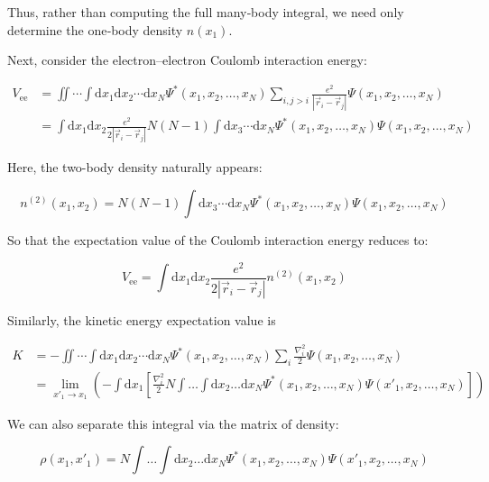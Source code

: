 Thus, rather than computing the full many‐body integral, we need only determine the one‐body density $n(x_1)$.

Next, consider the electron–electron Coulomb interaction energy:

\begin{equation}
\begin{aligned}
    V_\mathrm{ee}
    &= \iint\cdots\int \mathrm{d}x_1\mathrm{d}x_2\cdots\mathrm{d}x_N\Psi^*(x_1,x_2,\dots,x_N)\sum_{i,j>i}\frac{e^2}{|\vec{r}_i-\vec{r}_j|}\Psi(x_1,x_2,\dots,x_N) \\
    &= \int\mathrm{d}x_1\mathrm{d}x_2\frac{e^2}{2|\vec{r}_i-\vec{r}_j|}N(N-1)\int\mathrm{d}x_3\cdots\mathrm{d}x_N\Psi^*(x_1,x_2,\dots,x_N)\Psi(x_1,x_2,\dots,x_N)
\end{aligned}
\label{coulomb_interaction_energy}
\end{equation}

Here, the two-body density naturally appears:

\begin{equation}
n^{(2)}(x_1,x_2)=N(N-1)\int\mathrm{d}x_3\cdots\mathrm{d}x_N\Psi^*(x_1,x_2,\dots,x_N)\Psi(x_1,x_2,\dots,x_N)
\label{two-body_density}
\end{equation}

So that the expectation value of the Coulomb interaction energy reduces to:

\begin{equation}
V_\mathrm{ee}=\int\mathrm{d}x_1\mathrm{d}x_2\frac{e^2}{2|\vec{r}_i-\vec{r}_j|}n^{(2)}(x_1,x_2)
\label{observables_two-body_density}
\end{equation}

Similarly, the kinetic energy expectation value is

\begin{equation}
\begin{aligned}
    K&= -\iint\cdots\int \mathrm{d}x_1\mathrm{d}x_2\cdots\mathrm{d}x_N\Psi^*(x_1,x_2,\dots,x_N)\sum_{i}\frac{\nabla_i^2}{2}\Psi(x_1,x_2,\dots,x_N) \\
    &= \lim_{x'_1\to x_1}\left( -\int\mathrm{d}x_1\left[\frac{\nabla_i^2}{2}N\int\dots\int\mathrm{d}x_2\dots\mathrm{d}x_N\Psi^*(x_1,x_2,\dots,x_N)\Psi(x'_1,x_2,\dots,x_N) \right]\right)
\end{aligned}
\label{kinetic_energy}
\end{equation}

We can also separate this integral via the matrix of density:

\begin{equation}
\rho(x_1,x'_1)
=N\int\dots\int\mathrm{d}x_2\dots\mathrm{d}x_N\Psi^*(x_1,x_2,\dots,x_N)\Psi(x'_1,x_2,\dots,x_N) 
\label{density_matrix}
\end{equation}


